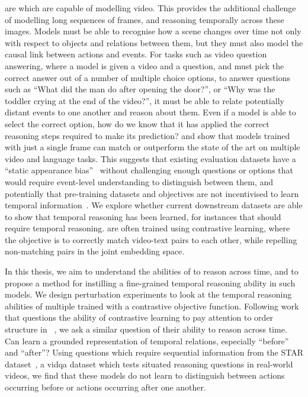  are  which are capable of modelling video.
This provides the additional challenge of modelling long sequences of frames,
and reasoning temporally across these images. Models must be able to recognise
how a scene changes over time not only with respect to objects and relations
between them, but they must also model the causal link between actions and
events. For tasks such as video question answering, where a model is given a
video and a question, and must pick the correct answer out of a number of
multiple choice options, to answer questions such as ``What did the man do
after opening the door?'', or ``Why was the toddler crying at the end of the
video?'', it must be able to relate potentially distant events to one another
and reason about them.  Even if a model is able to select the correct option,
how do we know that it has applied the correct reasoning steps required to make
its prediction?  \citet{lei2023revealing} and \citet{buch2022revisiting} show
that models trained with just a single frame can match or outperform the state
of the art on multiple video and language tasks. This suggests that existing
evaluation datasets have a ``static appearance bias''~\citep{lei2023revealing}
without challenging enough questions or options that would require event-level
understanding to distinguish between them, and potentially that pre-training
datasets and objectives are not incentivised to learn temporal
information~\cite{momeni2023verbs}. We explore whether current downstream
datasets are able to show that temporal reasoning has been learned, for
instances that should require temporal reasoning.  are often
trained using contrastive learning, where the objective is to correctly match
video-text pairs to each other, while repelling non-matching pairs in the joint
embedding space. 

In this thesis, we aim to understand the abilities of  to
reason across time, and to propose a method for instilling a fine-grained
temporal reasoning ability in such models. We design perturbation experiments
to look at the temporal reasoning abilities of multiple 
trained with a contrastive objective function. Following work that questions
the ability of contrastive learning to pay attention to order structure in
~\citep{yuksekgonul2023when}, we ask a similar question of
their ability to reason across time. Can  learn a grounded
representation of temporal relations, especially ``before'' and ``after''?
Using questions which require sequential information from the STAR
dataset~\cite{wu2021star}, a \acrfull{vidqa} dataset which tests situated
reasoning questions in real-world videos, we find that these models do not
learn to distinguish between actions occurring before or actions occurring
after one another.

